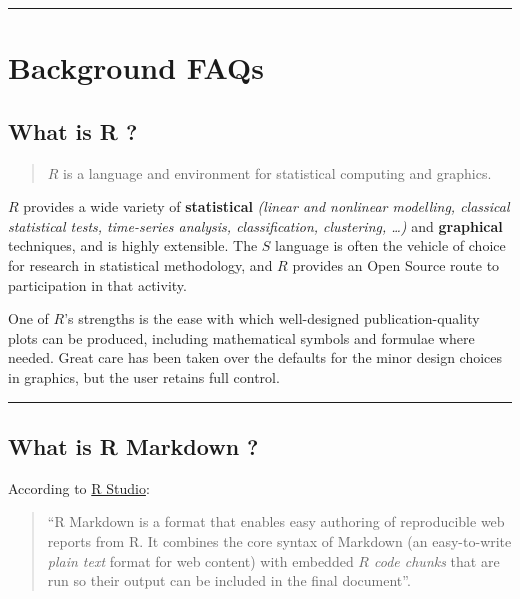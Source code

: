 \documentclass[]{book}
\begin{document}
\begin{center}\rule{0.5\linewidth}{\linethickness}\end{center}

\section*{Background FAQs}\label{background-faqs}

\subsection*{What is R ?}\label{what-is-r}

\begin{quote}
\(R\) is a language and environment for statistical computing and
graphics. \citep{R-base}
\end{quote}

\(R\) provides a wide variety of \textbf{statistical} \emph{(linear and
nonlinear modelling, classical statistical tests, time-series analysis,
classification, clustering, \ldots{})} and \textbf{graphical}
techniques, and is highly extensible. The \(S\) language is often the
vehicle of choice for research in statistical methodology, and \(R\)
provides an Open Source route to participation in that activity.

One of \(R\)'s strengths is the ease with which well-designed
publication-quality plots can be produced, including mathematical
symbols and formulae where needed. Great care has been taken over the
defaults for the minor design choices in graphics, but the user retains
full control.

\begin{center}\rule{0.5\linewidth}{\linethickness}\end{center}

\subsection*{What is R Markdown ?}\label{what-is-r-markdown}

According to \href{www.rstudio.com}{R Studio}:

\begin{quote}
``R Markdown is a format that enables easy authoring of reproducible web
reports from R. It combines the core syntax of Markdown (an
easy-to-write \emph{plain text} format for web content) with embedded
\emph{\(R\) code chunks} that are run so their output can be included in
the final document''.
\end{quote}
\end{document}

